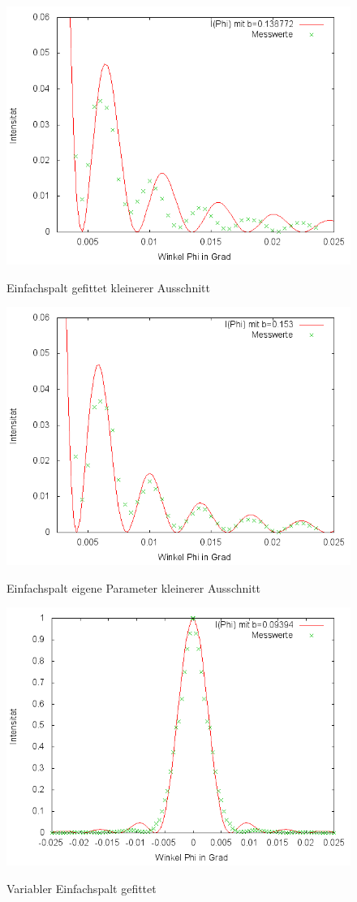 \begin{figure}[htbp]
\includegraphics[width=12cm]{pics/2.png}
\centering
\label{a3}
\caption{Einfachspalt gefittet kleinerer Ausschnitt}
\end{figure}

\begin{figure}[htbp]
\includegraphics[width=12cm]{pics/4.png}
\centering
\label{a4}
\caption{Einfachspalt eigene Parameter kleinerer Ausschnitt}
\end{figure}


\begin{figure}[htbp]
\includegraphics[width=12cm]{pics/5.png}
\centering
\label{a5}
\caption{Variabler Einfachspalt gefittet}
\end{figure}

